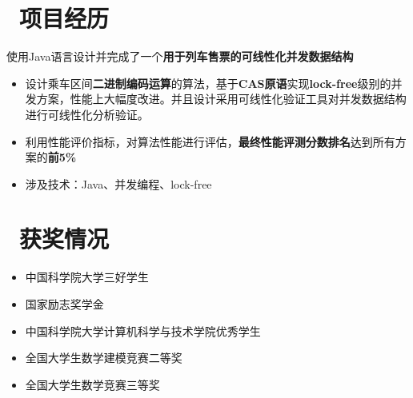 \documentclass{resume}
\begin{document}
  \section{\faUsers\ 项目经历}
  \begin{onehalfspacing}
    使用Java语言设计并完成了一个\textbf{用于列车售票的可线性化并发数据结构}
  \begin{itemize}
    \item 设计乘车区间\textbf{二进制编码运算}的算法，基于\textbf{CAS原语}实现\textbf{lock-free}级别的并发方案，性能上大幅度改进。并且设计采用可线性化验证工具对并发数据结构进行可线性化分析验证。
    \item 利用性能评价指标，对算法性能进行评估，\textbf{最终性能评测分数排名}达到所有方案的\textbf{前5\%}
    \item 涉及技术：Java、并发编程、lock-free
  \end{itemize}
  \end{onehalfspacing}



\section{\faHeartO\ 获奖情况}
\begin{itemize}[parsep=0.5ex]
  \item 中国科学院大学三好学生
  \item 国家励志奖学金
  \item 中国科学院大学计算机科学与技术学院优秀学生
  \item 全国大学生数学建模竞赛二等奖
  \item 全国大学生数学竞赛三等奖
\end{itemize}
\end{document}
